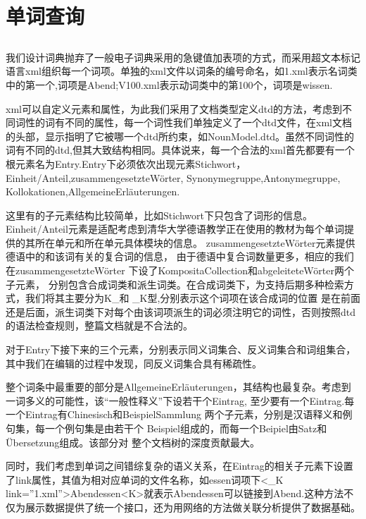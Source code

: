 \documentclass[12pt]{article}
\begin{document}
\section{单词查询}

\subsection{\textbf{}}
	我们设计词典抛弃了一般电子词典采用的急键值加表项的方式，而采用超文本标记语言xml组织每一个词项。单独的xml文件以词条的编号命名，如1.xml表示名词类中的第一个,词项是Abend;V100.xml表示动词类中的第100个，词项是wissen.
	
	xml可以自定义元素和属性，为此我们采用了文档类型定义dtd的方法，考虑到不同词性的词有不同的属性，每一个词性我们单独定义了一个dtd文件，在xml文档的头部，显示指明了它被哪一个dtd所约束，如NounModel.dtd。虽然不同词性的词有不同的dtd,但其大致结构相同。具体说来，每一个合法的xml首先都要有一个根元素名为Entry.Entry下必须依次出现元素Stichwort，Einheit/Anteil,zusammengesetzteWörter,
Synonymegruppe,Antonymegruppe,
Kollokationen,AllgemeineErläuterungen.

这里有的子元素结构比较简单，比如Stichwort下只包含了词形的信息。
Einheit/Anteil元素是适配考虑到清华大学德语教学正在使用的教材为每个单词提供的其所在单元和所在单元具体模块的信息。
zusammengesetzteWörter元素提供德语中的和该词有关的复合词的信息，
由于德语中复合词数量更多，相应的我们在zusammengesetzteWörter
下设了KompositaCollection和abgeleiteteWörter两个子元素，
分别包含合成词类和派生词类。在合成词类下，为支持后期多种检索方式，我们将其主要分为K\_和 \_K型,分别表示这个词项在该合成词的位置
是在前面还是后面，派生词类下对每个由该词项派生的词必须注明它的词性，否则按照dtd的语法检查规则，整篇文档就是不合法的。

对于Entry下接下来的三个元素，分别表示同义词集合、反义词集合和词组集合，其中我们在编辑的过程中发现，同反义词集合具有稀疏性。

整个词条中最重要的部分是AllgemeineErläuterungen，其结构也最复杂。考虑到一词多义的可能性，该“一般性释义”下设若干个Eintrag,
至少要有一个Eintrag.每一个Eintrag有Chinesisch和BeispielSammlung
两个子元素，分别是汉语释义和例句集，每一个例句集是由若干个
Beispiel组成的，而每一个Beipiel由Satz和Übersetzung组成。该部分对
整个文档树的深度贡献最大。

同时，我们考虑到单词之间错综复杂的语义关系，在Eintrag的相关子元素下设置了link属性，其值为相对应单词的文件名称，如essen词项下<\_K link=''1.xml''>Abendessen<\/K>就表示Abendessen可以链接到Abend.这种方法不仅为展示数据提供了统一个接口，还为用网络的方法做关联分析提供了数据基础。
\end{document}

